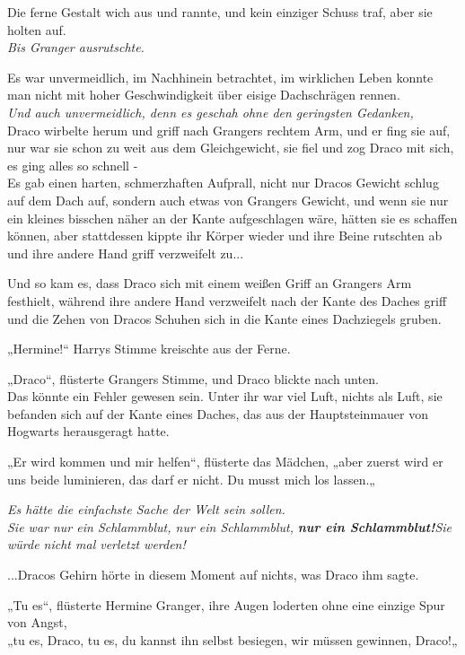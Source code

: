 {Die ferne Gestalt wich aus und rannte, und kein einziger Schuss traf, aber sie holten auf.\\ \emph{\hfill\break Bis Granger ausrutschte.}

Es war unvermeidlich, im Nachhinein betrachtet, im wirklichen Leben konnte man nicht mit hoher Geschwindigkeit über eisige Dachschrägen rennen.\\ \emph{Und auch unvermeidlich, denn es geschah ohne den geringsten Gedanken,}\\ Draco wirbelte herum und griff nach Grangers rechtem Arm, und er fing sie auf, nur war sie schon zu weit aus dem Gleichgewicht, sie fiel und zog Draco mit sich, es ging alles so schnell -\\ Es gab einen harten, schmerzhaften Aufprall, nicht nur Dracos Gewicht schlug auf dem Dach auf, sondern auch etwas von Grangers Gewicht, und wenn sie nur ein kleines bisschen näher an der Kante aufgeschlagen wäre, hätten sie es schaffen können, aber stattdessen kippte ihr Körper wieder und ihre Beine rutschten ab und ihre andere Hand griff verzweifelt zu...

Und so kam es, dass Draco sich mit einem weißen Griff an Grangers Arm festhielt, während ihre andere Hand verzweifelt nach der Kante des Daches griff und die Zehen von Dracos Schuhen sich in die Kante eines Dachziegels gruben.

„Hermine!“ Harrys Stimme kreischte aus der Ferne.

„Draco“, flüsterte Grangers Stimme, und Draco blickte nach unten.\\ Das könnte ein Fehler gewesen sein. Unter ihr war viel Luft, nichts als Luft, sie befanden sich auf der Kante eines Daches, das aus der Hauptsteinmauer von Hogwarts herausgeragt hatte.

„Er wird kommen und mir helfen“, flüsterte das Mädchen, „aber zuerst wird er uns beide luminieren, das darf er nicht. Du musst mich los lassen.„

\emph{Es hätte die einfachste Sache der Welt sein sollen.}\\ \emph{Sie war nur ein Schlammblut, nur ein Schlammblut,} \textbf{\emph{nur ein Schlammblut!}}\emph{\hfill\break Sie würde nicht mal verletzt werden!}

...Dracos Gehirn hörte in diesem Moment auf nichts, was Draco ihm sagte.

„Tu es“, flüsterte Hermine Granger, ihre Augen loderten ohne eine einzige Spur von Angst,\\ „tu es, Draco, tu es, du kannst ihn selbst besiegen, wir müssen gewinnen, Draco!„

}
